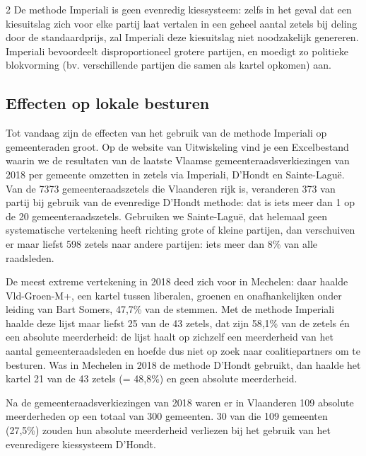\begin{multicols}{2}
De methode Imperiali is geen evenredig kiessysteem: zelfs in het geval dat een kiesuitslag zich voor elke partij laat vertalen in een geheel aantal zetels bij deling door de standaardprijs, zal Imperiali deze kiesuitslag niet noodzakelijk genereren. Imperiali bevoordeelt disproportioneel grotere partijen, en moedigt zo politieke blokvorming (bv. verschillende partijen die samen als kartel opkomen) aan. 

\subsection{Effecten op lokale besturen}
Tot vandaag zijn de effecten van het gebruik van de methode Imperiali op gemeenteraden groot. Op de website van Uitwiskeling vind je een Excelbestand waarin we de resultaten van de laatste Vlaamse gemeenteraadsverkiezingen van 2018 per gemeente omzetten in zetels via Imperiali, D'Hondt en Sainte-Laguë. Van de 7373 gemeenteraadszetels die Vlaanderen rijk is, veranderen 373 van partij bij gebruik van de evenredige D'Hondt methode: dat is iets meer dan 1 op de 20 gemeenteraadszetels. Gebruiken we Sainte-Laguë, dat helemaal geen systematische vertekening heeft richting grote of kleine partijen, dan verschuiven er maar liefst 598 zetels naar andere partijen: iets meer dan 8\% van alle raadsleden.

De meest extreme vertekening in 2018 deed zich voor in Mechelen: daar haalde Vld-Groen-M+, een kartel tussen liberalen, groenen en onafhankelijken onder leiding van Bart Somers, 47,7\% van de stemmen. Met de methode Imperiali haalde deze lijst maar liefst 25 van de 43 zetels, dat zijn 58,1\% van de zetels én een absolute meerderheid: de lijst haalt op zichzelf een meerderheid van het aantal gemeenteraadsleden en hoefde dus niet op zoek naar coalitiepartners om te besturen. Was in Mechelen in 2018 de methode D'Hondt gebruikt, dan haalde het kartel 21 van de 43 zetels (= 48,8\%) en geen absolute meerderheid.

Na de gemeenteraadsverkiezingen van 2018 waren er in Vlaanderen 109 absolute meerderheden op een totaal van 300 gemeenten. 30 van die 109 gemeenten (27,5\%) zouden hun absolute meerderheid verliezen bij het gebruik van het evenredigere kiessysteem D'Hondt.


\end{multicols}
